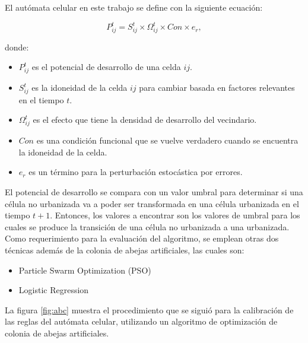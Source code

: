 El autómata celular en este trabajo se define con la siguiente ecuación:

\begin{equation} \label{eq:8}
P^t_{ij} = S^t_{ij}\times\Omega^t_{ij}\times Con\times e_r,
\end{equation}

donde:
\begin{itemize}
	\item $P^t_{ij} $ es el potencial de desarrollo de una celda $ij$.
	\item $S^t_{ij}$ es la idoneidad de la celda $ij$ para cambiar basada en factores relevantes en el tiempo $t$.
	\item $\Omega^t_{ij}$ es el efecto que tiene la densidad de desarrollo del vecindario.
	\item $Con$ es una condición funcional que se vuelve verdadero cuando se encuentra la idoneidad de la celda.
	\item $e_r$ es un término para la perturbación estocástica por errores.
\end{itemize}

El potencial de desarrollo se compara con un valor umbral para determinar si una célula no urbanizada va a poder ser transformada en una célula urbanizada en el tiempo $t+1$. Entonces, los valores a encontrar son los valores de umbral para los cuales se produce la transición de una célula no urbanizada a una urbanizada.
\\

Como requerimiento para la evaluación del algoritmo, se emplean otras dos técnicas además de la colonia de abejas artificiales, las cuales son:
\begin{itemize}
	\item Particle Swarm Optimization (PSO)
	\item Logistic Regression
\end{itemize}

La figura \ref{fig:abc} muestra el procedimiento que se siguió para la calibración de las reglas del autómata celular, utilizando un algoritmo de optimización de colonia de abejas artificiales.

